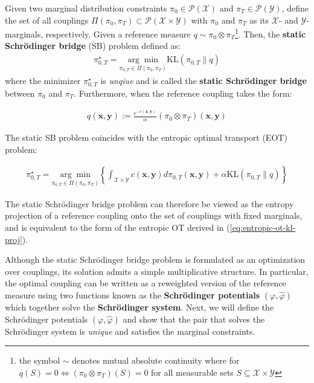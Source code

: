 \documentclass{article}
\newcommand{\boldtext}[1]{\textbf{\textcolor{MyGreen}{#1}}}
\begin{document}
\begin{definition}\label{def:static-sb-problem}
    Given two marginal distribution constraints $\pi_0\in \mathcal{P}(\mathcal{X})$ and $\pi_T\in \mathcal{P}(\mathcal{Y})$, define the set of all couplings $ \Pi(\pi_0, \pi_T)\subset\mathcal{P}(\mathcal{X}\times \mathcal{Y})$ with $\pi_0$ and $\pi_T$ as its $\mathcal{X}$- and $\mathcal{Y}$-marginals, respectively. Given a reference measure $q\sim \pi_0\otimes \pi_T$\footnote{the symbol $\sim$ denotes mutual absolute continuity where for $q(S)=0\iff (\pi_0\otimes \pi_T)(S)=0$ for all measurable sets $S\subseteq \mathcal{X}\times\mathcal{Y}$}. Then, the \textbf{static Schrödinger bridge} (SB) problem defined as:
    \begin{align}
        \pi^\star_{0,T}=\underset{\pi_{0,T}\in \Pi(\pi_0, \pi_T)}{\arg\min}\text{KL}(\pi_{0,T}\|q)\tag{Static SB Problem}\label{eq:static-sb}
    \end{align}
    where the minimizer $\pi^\star_{0,T}$ is \textit{unqiue} and is called the \textbf{static Schrödinger bridge} between $\pi_0$ and $\pi_T$. Furthermore, when the reference coupling takes the form:
    \begin{small}
    \begin{align}
        q(\boldsymbol{x},\boldsymbol{y}):=\frac{e^{-c(\boldsymbol{x},\boldsymbol{y})}}{\alpha}(\pi_0\otimes\pi_T) (\boldsymbol{x},\boldsymbol{y})
    \end{align}
    \end{small}
    The static SB problem coincides with the entropic optimal transport (EOT) problem:
    \begin{small}
    \begin{align}
        \pi^\star_{0,T}=\underset{\pi_{0,T}\in \Pi(\pi_0, \pi_T)}{\arg\min}\left\{\int_{\mathcal{X}\times \mathcal{Y}}c(\boldsymbol{x},\boldsymbol{y})d\pi_{0,T}(\boldsymbol{x},\boldsymbol{y})+\alpha \text{KL} (\pi_{0,T}\|q)\right\}
    \end{align}
    \end{small}
\end{definition}

The static Schrödinger bridge problem can therefore be viewed as the entropy projection of a reference coupling onto the set of couplings with fixed marginals, and is equivalent to the form of the entropic OT derived in (\ref{eq:entropic-ot-kl-proj}).

Although the static Schrödinger bridge problem is formulated as an optimization over couplings, its solution admits a simple multiplicative structure. In particular, the optimal coupling can be written as a reweighted version of the reference measure using two functions known as the \boldtext{Schrödinger potentials} $(\varphi, \hat{\varphi})$ which together solve the \boldtext{Schrödinger system}. Next, we will define the Schrödinger potentials $(\varphi, \hat{\varphi})$ and show that the pair that solves the Schrödinger system is \textit{unique} and satisfies the marginal constraints.
\end{document}
